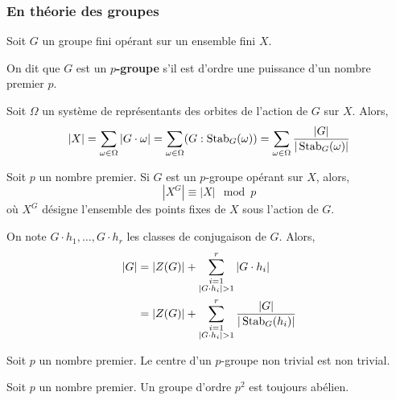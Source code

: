   \subsubsection{En théorie des groupes}


  Soit $G$ un groupe fini opérant sur un ensemble fini $X$.

  \begin{definition}
    On dit que $G$ est un \textbf{$p$-groupe} s'il est d'ordre une puissance d'un nombre premier $p$.
  \end{definition}

  \begin{theorem}
    Soit $\Omega$ un système de représentants des orbites de l'action de $G$ sur $X$. Alors,
    \[ |X| = \sum_{\omega \in \Omega} |G \cdot \omega| = \sum_{\omega \in \Omega} (G : \operatorname{Stab}_G(\omega)) = \sum_{\omega \in \Omega} \frac{|G|}{|\operatorname{Stab}_G(\omega)|} \]
  \end{theorem}

  \begin{corollary}
    Soit $p$ un nombre premier. Si $G$ est un $p$-groupe opérant sur $X$, alors,
    \[ |X^G| \equiv |X| \mod p \]
    où $X^G$ désigne l'ensemble des points fixes de $X$ sous l'action de $G$.
  \end{corollary}

  \begin{corollary}
    On note $G \cdot h_1, \dots, G \cdot h_r$ les classes de conjugaison de $G$. Alors,
    \begin{align*}
      \vert G \vert &= \vert Z(G) \vert + \sum_{\substack{i=1 \\ \vert G \cdot h_i \vert > 1}}^{r} \vert G \cdot h_i \vert \\
      &= \vert Z(G) \vert + \sum_{\substack{i=1 \\ \vert G \cdot h_i \vert > 1}}^{r} \frac{\vert G \vert}{\vert \operatorname{Stab}_G(h_i) \vert}
    \end{align*}
  \end{corollary}

  \begin{corollary}
    Soit $p$ un nombre premier. Le centre d'un $p$-groupe non trivial est non trivial.
  \end{corollary}

  \begin{corollary}
    Soit $p$ un nombre premier. Un groupe d'ordre $p^2$ est toujours abélien.
  \end{corollary}

